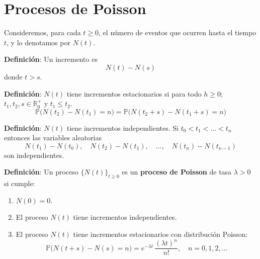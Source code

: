 \documentclass[12pt]{article}
\begin{document}
\section*{Procesos de Poisson}

Consideremos, para cada $t \geq 0$, el número de eventos que ocurren hasta el tiempo $t$, y lo denotamos por $N(t)$.

\textbf{Definición}: Un incremento es 
\begin{equation*}
N(t) - N(s)
\end{equation*}
donde $t > s$.

\textbf{Definición}: $N(t)$ tiene incrementos estacionarios si para todo $h \geq 0$; $t_1, t_2, s \in \mathbb{R}_{0}^+$ y $t_1 \leq t_{2}$.
\begin{equation*}
\mathbb{P}\big(N(t_{2}) - N(t_{1}) = n\big) 
= \mathbb{P}\big(N(t_{2}+s) - N(t_{1}+s) = n\big)
\end{equation*}

\begin{center}
\end{center}

\textbf{Definición}: $N(t)$ tiene incrementos independientes. Si $t_{0} < t_{1} < \dots < t_{n}$ entonces las variables aleatorias
\begin{equation*}
N(t_{1}) - N(t_{0}), \quad 
N(t_{2}) - N(t_{1}), \quad \dots, \quad 
N(t_{n}) - N(t_{n-1})
\end{equation*}
son independientes.

\textbf{Definición}: Un proceso $\{N(t)\}_{t \geq 0}$ es un \textbf{proceso de Poisson} de tasa $\lambda > 0$ si cumple:

\begin{enumerate}
    \item $N(0) = 0$.
    \item El proceso $N(t)$ tiene incrementos independientes.
    \item El proceso $N(t)$ tiene incrementos estacionarios con distribución Poisson:
    \begin{equation*}
    \mathbb{P}\big(N(t+s) - N(s) = n\big) 
    = e^{-\lambda t} \, \frac{(\lambda t)^n}{n!}, 
    \quad n = 0,1,2,\dots
    \end{equation*}
\end{enumerate}
\end{document}
